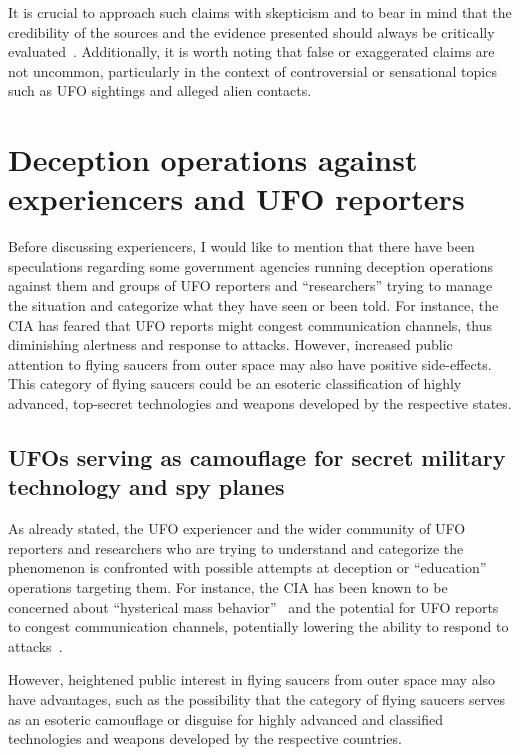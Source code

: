 It is crucial to approach such claims with skepticism and to bear in mind that the credibility of the sources and the evidence presented should always be critically evaluated~\cite{Appelle1995,Appelle2000}. Additionally, it is worth noting that false or exaggerated claims are not uncommon, particularly in the context of controversial or sensational topics such as UFO sightings and alleged alien contacts.



\section{Deception operations against experiencers and UFO reporters}
\label{2023-UFO-part-Perception-abductions-do}

Before discussing experiencers, I would like to mention that there have been speculations regarding some government agencies running deception operations against them and groups of UFO reporters and ``researchers'' trying to manage the situation and categorize what they have seen or been told. For instance, the CIA has feared that UFO reports might congest communication channels, thus diminishing alertness and response to attacks. However, increased public attention to flying saucers from outer space may also have positive side-effects. This category of flying saucers could be an esoteric classification of highly advanced, top-secret technologies and weapons developed by the respective states.


\subsection{UFOs serving as camouflage for secret military technology and spy planes}

As already stated, the UFO experiencer
and the wider community of UFO reporters and researchers who are trying to understand and categorize the phenomenon
is confronted with possible attempts at deception or ``education'' operations targeting them.
For instance, the CIA has been known to be concerned about ``hysterical mass behavior''~\cite[Chapter~4]{Jacobsen2011} and the potential for UFO reports to congest communication channels,
potentially lowering the ability to respond to attacks~\cite{Haines-CIA-UFO}.

However, heightened public interest in flying saucers from outer space may also have advantages,
such as the possibility that the category of flying saucers serves as an esoteric camouflage or disguise for
highly advanced and classified technologies and weapons developed by the respective countries.

